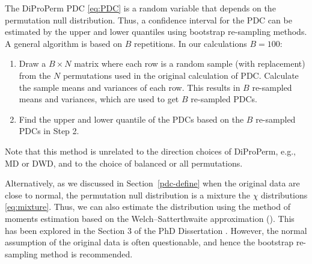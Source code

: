 \documentclass[12pt]{article}
\begin{document}


The DiProPerm PDC \eqref{eq:PDC} is a random variable that depends on the permutation null distribution. Thus, a confidence interval for the PDC can be estimated by the upper and lower quantiles using bootstrap re-sampling methods. A general algorithm is based on $B$ repetitions. In our calculations $B=100$:
\begin{enumerate}
\item Draw a $B\times N$ matrix where each row is a random sample (with replacement) from the $N$ permutations used in the original calculation of PDC. Calculate the sample means and variances of each row. This results in $B$ re-sampled means and variances, which are used to get $B$ re-sampled PDCs. 
\item Find the upper and lower quantile of the PDCs based on the $B$ re-sampled PDCs in Step 2. 
\end{enumerate}
Note that this method is unrelated to the direction choices of DiProPerm, e.g., MD or DWD, and to the choice of balanced or all permutations.

Alternatively, as we discussed in Section~\ref{pdc-define} when the original data are close to normal, the permutation null distribution is a mixture the $\chi$ distributions \eqref{eq:mixture}. Thus, we can also estimate the distribution using the method of moments estimation based on the Welch–Satterthwaite approximation (\citet{satterthwaite1946approximate}). This has been explored in the Section 3 of the PhD Dissertation \cite{yang2021machine}. However, the normal assumption of the original data is often questionable, and hence the bootstrap re-sampling method is recommended.
\end{document}
